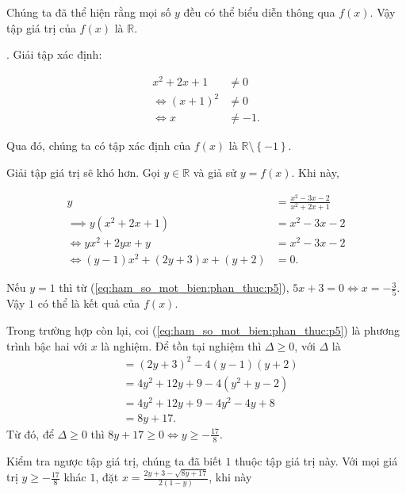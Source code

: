 Chúng ta đã thể hiện rằng mọi số $y$ đều có thể biểu diễn thông qua $f(x)$. Vậy tập giá trị của $f(x)$ là $\mathbb{R}$.

. Giải tập xác định:

\begin{align*}
   x^2 + 2x + 1 &\neq 0 \\
   \iff (x + 1)^2 &\neq 0 \\
   \iff x &\neq -1.
\end{align*}

Qua đó, chúng ta có tập xác định của $f(x)$ là $\mathbb{R} \setminus \left\{-1\right\}$.

Giải tập giá trị sẽ khó hơn. Gọi $y\in\mathbb{R}$ và giả sử $y = f(x)$. Khi này,

\begin{align}
   y &= \frac{x^2 - 3x - 2}{x^2 + 2x + 1} \nonumber\\
   \implies y(x^2 + 2x + 1) &= x^2 - 3x - 2 \nonumber\\
   \iff yx^2 + 2yx + y &= x^2 - 3x - 2 \nonumber\\
   \iff (y - 1)x^2 + (2y + 3)x + (y + 2) &= 0. \label{eq:ham_so_mot_bien:phan_thuc:p5}
\end{align}

Nếu $y = 1$ thì từ (\ref{eq:ham_so_mot_bien:phan_thuc:p5}), $5x + 3 = 0 \iff x = -\frac{3}{5}$. Vậy $1$ có thể là kết quả của $f(x)$.

Trong trường hợp còn lại, coi (\ref{eq:ham_so_mot_bien:phan_thuc:p5}) là phương trình bậc hai với $x$ là nghiệm. Để tồn tại nghiệm thì $\Delta \geq 0$, với $\Delta$ là 
\begin{align*}
   &= (2y + 3)^2 - 4(y - 1)(y + 2) \\
   &= 4y^2 + 12y + 9 - 4(y^2 + y - 2) \\
   &= 4y^2 + 12y + 9 - 4y^2 - 4y + 8 \\
   &= 8y + 17.
\end{align*}
Từ đó, để $\Delta \geq 0$ thì $8y + 17 \geq 0 \iff y \geq -\frac{17}{8}$.

Kiểm tra ngược tập giá trị, chúng ta đã biết $1$ thuộc tập giá trị này. Với mọi giá trị $y \geq -\frac{17}{8}$ khác $1$, đặt $x = \frac{2y + 3 - \sqrt{8y + 17}}{2(1 - y)}$, khi này

